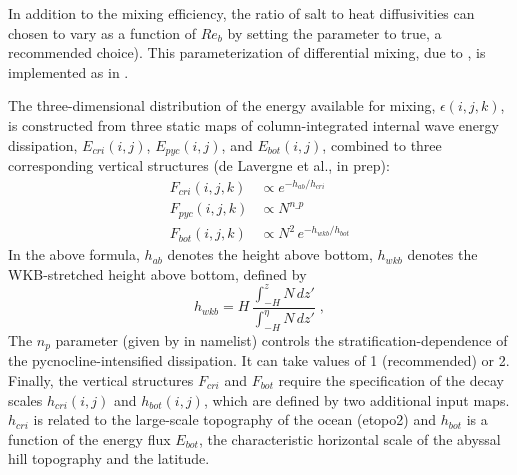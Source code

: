 \documentclass[../tex_main/NEMO_manual]{subfiles}
\begin{document}
In addition to the mixing efficiency, the ratio of salt to heat diffusivities can chosen to vary 
as a function of $Re_b$ by setting the  parameter to true, a recommended choice). 
This parameterization of differential mixing, due to \cite{Jackson_Rehmann_JPO2014}, 
is implemented as in \cite{de_lavergne_JPO2016_efficiency}.

The three-dimensional distribution of the energy available for mixing, $\epsilon(i,j,k)$, is constructed 
from three static maps of column-integrated internal wave energy dissipation, $E_{cri}(i,j)$, 
$E_{pyc}(i,j)$, and $E_{bot}(i,j)$, combined to three corresponding vertical structures 
(de Lavergne et al., in prep):
\begin{align*}
F_{cri}(i,j,k) &\propto e^{-h_{ab} / h_{cri} }\\
F_{pyc}(i,j,k) &\propto N^{n\_p}\\
F_{bot}(i,j,k) &\propto N^2 \, e^{- h_{wkb} / h_{bot} }
\end{align*} 
In the above formula, $h_{ab}$ denotes the height above bottom, 
$h_{wkb}$ denotes the WKB-stretched height above bottom, defined by
\begin{equation*}
h_{wkb} = H \, \frac{ \int_{-H}^{z} N \, dz' } { \int_{-H}^{\eta} N \, dz'  } \; ,
\end{equation*}
The $n_p$ parameter (given by  in  namelist)  controls the stratification-dependence of the pycnocline-intensified dissipation. 
It can take values of 1 (recommended) or 2.
Finally, the vertical structures $F_{cri}$ and $F_{bot}$ require the specification of 
the decay scales $h_{cri}(i,j)$ and $h_{bot}(i,j)$, which are defined by two additional input maps. 
$h_{cri}$ is related to the large-scale topography of the ocean (etopo2) 
and $h_{bot}$ is a function of the energy flux $E_{bot}$, the characteristic horizontal scale of 
the abyssal hill topography \citep{Goff_JGR2010} and the latitude.

\end{document}
